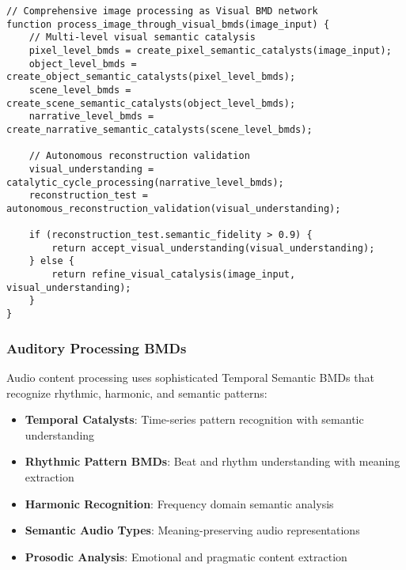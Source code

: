 \documentclass[12pt,a4paper,twoside]{article}
\begin{document}
\begin{lstlisting}[caption=Theoretical Visual BMD Architecture]
// Comprehensive image processing as Visual BMD network
function process_image_through_visual_bmds(image_input) {
    // Multi-level visual semantic catalysis
    pixel_level_bmds = create_pixel_semantic_catalysts(image_input);
    object_level_bmds = create_object_semantic_catalysts(pixel_level_bmds);
    scene_level_bmds = create_scene_semantic_catalysts(object_level_bmds);
    narrative_level_bmds = create_narrative_semantic_catalysts(scene_level_bmds);

    // Autonomous reconstruction validation
    visual_understanding = catalytic_cycle_processing(narrative_level_bmds);
    reconstruction_test = autonomous_reconstruction_validation(visual_understanding);

    if (reconstruction_test.semantic_fidelity > 0.9) {
        return accept_visual_understanding(visual_understanding);
    } else {
        return refine_visual_catalysis(image_input, visual_understanding);
    }
}
\end{lstlisting}

\subsubsection{Auditory Processing BMDs}

Audio content processing uses sophisticated Temporal Semantic BMDs that recognize rhythmic, harmonic, and semantic patterns:

\begin{itemize}
\item \textbf{Temporal Catalysts}: Time-series pattern recognition with semantic understanding
\item \textbf{Rhythmic Pattern BMDs}: Beat and rhythm understanding with meaning extraction
\item \textbf{Harmonic Recognition}: Frequency domain semantic analysis
\item \textbf{Semantic Audio Types}: Meaning-preserving audio representations
\item \textbf{Prosodic Analysis}: Emotional and pragmatic content extraction
\end{itemize}
\end{document}
